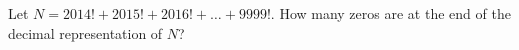 Let $N = 2014! + 2015! + 2016! + \dots + 9999!$. How many zeros are at the end of the decimal representation of $N$?
